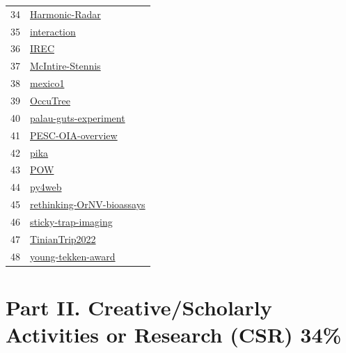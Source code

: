 \begin{longtable}{rl}
	34 &                                             \href{https://github.com/aubreymoore/Harmonic-Radar}{Harmonic-Radar} \\
	35 &                                                   \href{https://github.com/aubreymoore/interaction}{interaction} \\
	36 &                                                                 \href{https://github.com/aubreymoore/IREC}{IREC} \\
	37 &                                         \href{https://github.com/aubreymoore/McIntire-Stennis}{McIntire-Stennis} \\
	38 &                                                           \href{https://github.com/aubreymoore/mexico1}{mexico1} \\
	39 &                                                         \href{https://github.com/aubreymoore/OccuTree}{OccuTree} \\
	40 &                               \href{https://github.com/aubreymoore/palau-guts-experiment}{palau-guts-experiment} \\
	41 &                                       \href{https://github.com/aubreymoore/PESC-OIA-overview}{PESC-OIA-overview} \\
	42 &                                                                 \href{https://github.com/aubreymoore/pika}{pika} \\
	43 &                                                                   \href{https://github.com/aubreymoore/POW}{POW} \\
	44 &                                                             \href{https://github.com/aubreymoore/py4web}{py4web} \\
	45 &                       \href{https://github.com/aubreymoore/rethinking-OrNV-bioassays}{rethinking-OrNV-bioassays} \\
	46 &                                   \href{https://github.com/aubreymoore/sticky-trap-imaging}{sticky-trap-imaging} \\
	47 &                                             \href{https://github.com/aubreymoore/TinianTrip2022}{TinianTrip2022} \\
	48 &                                     \href{https://github.com/aubreymoore/young-tekken-award}{young-tekken-award} \\
\end{longtable}

\newpage
\section{Part II. Creative/Scholarly Activities or Research (CSR) 34\%}

